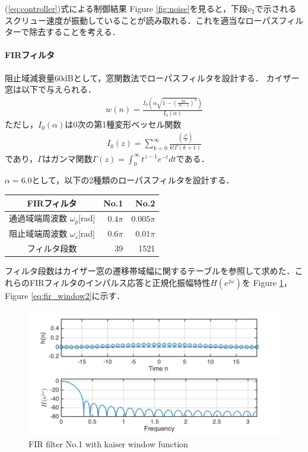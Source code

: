 \documentclass[twocolumn,oneside,a4paper]{article}
\begin{document}
(\ref{eq:controller})式による制御結果
Figure \ref{fig:noise}を見ると，下段$v_2$で示されるスクリュー速度が振動していることが読み取れる．これを適当なローパスフィルターで除去することを考える．

\paragraph{FIRフィルタ}
阻止域減衰量60dBとして，窓関数法でローパスフィルタを設計する．
カイザー窓は以下で与えられる．
\begin{eqnarray*}
	w(n) = \frac{I_0 \left( \alpha \sqrt{1-\left(\frac{2n}{N-1}\right)^2} \right) }{I_0(\alpha)}	
\end{eqnarray*}
ただし，$I_0({\alpha})$は0次の第1種変形ベッセル関数
\begin{eqnarray*}
 I_0(z)	= \sum_{k=0}^{\infty}\frac{\left(\frac{z^2}{4}\right)}{k!\Gamma (k+1)}
\end{eqnarray*}
であり，$\Gamma$はガンマ関数$\Gamma(z) = \int_0^{\infty} t^{z-1}e^{-t} dt$である．

$\alpha = 6.0$として，以下の2種類のローパスフィルタを設計する．

\begin{tabular}{crr}
\toprule
FIRフィルタ  & No.1 & No.2 \\
\midrule
通過域端周波数 $\omega_p$[rad] & $0.4 \pi$ & $0.005 \pi$ \\
阻止域端周波数 $\omega_s$[rad] & $0.6 \pi$ & $0.01 \pi$ \\
フィルタ段数 & 39 & 1521 \\
\bottomrule
\end{tabular}


フィルタ段数はカイザー窓の遷移帯域幅に関するテーブルを参照して求めた．これらのFIRフィルタのインパルス応答と正規化振幅特性$H(e^{j \omega})$を Figure \ref{eq:fir_window}，Figure \ref{eq:fir_window2}に示す．


\begin{figure}[htbp]
    \includegraphics[bb=0 0 432 216,width=1\columnwidth]{impulse_h.pdf}
    \caption{FIR filter No.1 with kaiser window function}
   \label{eq:fir_window}
\end{figure}
\end{document}

